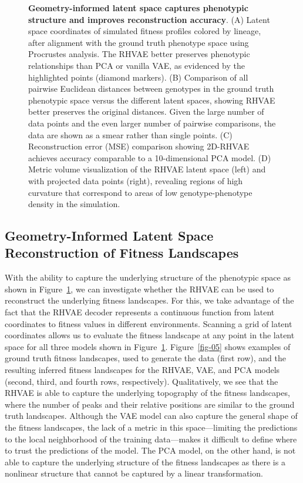 \documentclass[
]{scrartcl}
\begin{document}
\begin{refsegment}
\begin{figure}
{}

\caption{\label{fig-04}\textbf{Geometry-informed latent space captures
phenotypic structure and improves reconstruction accuracy}. (A) Latent
space coordinates of simulated fitness profiles colored by lineage,
after alignment with the ground truth phenotype space using Procrustes
analysis. The RHVAE better preserves phenotypic relationships than PCA
or vanilla VAE, as evidenced by the highlighted points (diamond
markers). (B) Comparison of all pairwise Euclidean distances between
genotypes in the ground truth phenotypic space versus the different
latent spaces, showing RHVAE better preserves the original distances.
Given the large number of data points and the even larger number of
pairwise comparisons, the data are shown as a smear rather than single
points. (C) Reconstruction error (MSE) comparison showing 2D-RHVAE
achieves accuracy comparable to a 10-dimensional PCA model. (D) Metric
volume visualization of the RHVAE latent space (left) and with projected
data points (right), revealing regions of high curvature that correspond
to areas of low genotype-phenotype density in the simulation.}

\end{figure}%

\subsection{Geometry-Informed Latent Space Reconstruction of Fitness
Landscapes}\label{sec-fitness-landscapes}

With the ability to capture the underlying structure of the phenotypic
space as shown in Figure~\ref{fig-04}, we can investigate whether the
RHVAE can be used to reconstruct the underlying fitness landscapes. For
this, we take advantage of the fact that the RHVAE decoder represents a
continuous function from latent coordinates to fitness values in
different environments. Scanning a grid of latent coordinates allows us
to evaluate the fitness landscape at any point in the latent space for
all three models shown in Figure~\ref{fig-04}. Figure~\ref{fig-05} shows
examples of ground truth fitness landscapes, used to generate the data
(first row), and the resulting inferred fitness landscapes for the
RHVAE, VAE, and PCA models (second, third, and fourth rows,
respectively). Qualitatively, we see that the RHVAE is able to capture
the underlying topography of the fitness landscapes, where the number of
peaks and their relative positions are similar to the ground truth
landscapes. Although the VAE model can also capture the general shape of
the fitness landscapes, the lack of a metric in this space---limiting
the predictions to the local neighborhood of the training data---makes
it difficult to define where to trust the predictions of the model. The
PCA model, on the other hand, is not able to capture the underlying
structure of the fitness landscapes as there is a nonlinear structure
that cannot be captured by a linear transformation.


\end{refsegment}
\end{document}

